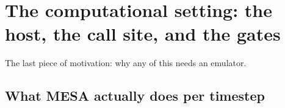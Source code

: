 %

\section{The computational setting: the host, the call site, and the gates}
\label{part:host}

The last piece of motivation: why any of this needs an emulator.

\subsection{What MESA actually does per timestep}
\label{sec:mesastep}

